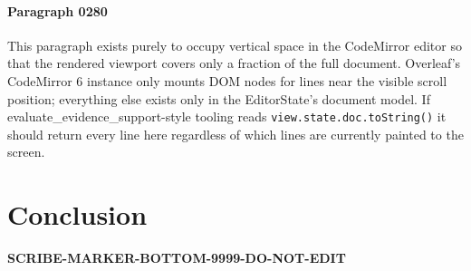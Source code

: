 \documentclass{article}
\begin{document}
\paragraph{Paragraph 0280}
This paragraph exists purely to occupy vertical space in the CodeMirror editor so that the rendered viewport covers only a fraction of the full document. Overleaf's CodeMirror 6 instance only mounts DOM nodes for lines near the visible scroll position; everything else exists only in the EditorState's document model. If evaluate\_evidence\_support-style tooling reads \texttt{view.state.doc.toString()} it should return every line here regardless of which lines are currently painted to the screen.

\section{Conclusion}
\textbf{SCRIBE-MARKER-BOTTOM-9999-DO-NOT-EDIT}



\end{document}
